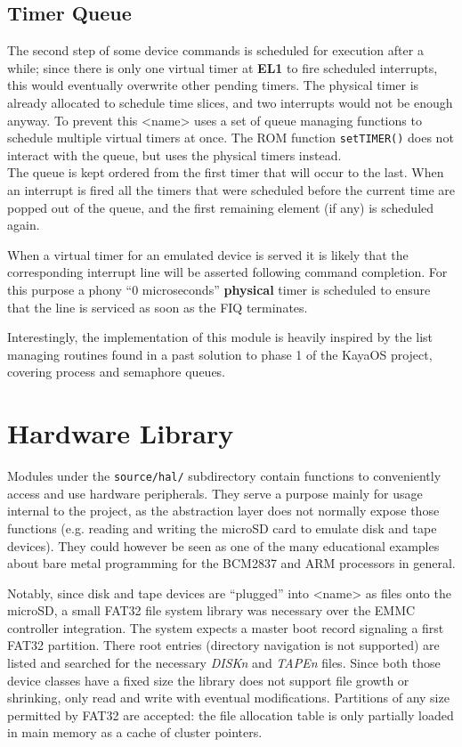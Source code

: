 \documentclass[12pt,a4paper,openright,twoside]{report}
\begin{document}
\subsection{Timer Queue}
The second step of some device commands is scheduled for execution after a while;
since there is only one virtual timer at \textbf{EL1} to fire scheduled interrupts, this would
eventually overwrite other pending timers. The physical timer is already allocated
to schedule time slices, and two interrupts would not be enough anyway.
To prevent this <name> uses a set of queue managing functions to 
schedule multiple virtual timers at once. 
The ROM function {\tt setTIMER()} does not interact with the queue, but uses
the physical timers instead.\\
The queue is kept ordered from the first timer that will occur to the last.
When an interrupt is fired all the timers that were scheduled before the
current time are popped out of the queue, and the first remaining element (if any)
is scheduled again.

When a virtual timer for an emulated device is served it is likely that the
corresponding interrupt line will be asserted following command completion. 
For this purpose a phony ``0 microseconds'' \textbf{physical} timer is scheduled to 
ensure that the line is serviced as soon as the FIQ terminates.

Interestingly, the implementation of this module is heavily inspired by the list
managing routines found in a past solution to phase 1 of the KayaOS project, 
covering process and semaphore queues.

\section{Hardware Library}
Modules under the {\tt source/hal/} subdirectory contain functions to conveniently access 
and use hardware peripherals. They serve a purpose mainly for usage internal to 
the project, as the abstraction layer does not normally expose those functions
(e.g. reading and writing the microSD card to emulate disk and tape devices).
They could however be seen as one of the many educational examples about 
bare metal programming for the BCM2837 and ARM processors in general.

Notably, since disk and tape devices are ``plugged'' into <name> as files onto
the microSD, a small FAT32 file system library was necessary over the EMMC controller
integration.
The system expects a master boot record signaling a first FAT32 partition. There
root entries (directory navigation is not supported) are listed and searched for
the necessary \textit{DISKn} and \textit{TAPEn} files. Since both those device
classes have a fixed size the library does not support file growth or shrinking,
only read and write with eventual modifications.
Partitions of any size permitted by FAT32 are accepted: the file allocation table
is only partially loaded in main memory as a cache of cluster pointers.
\end{document}
